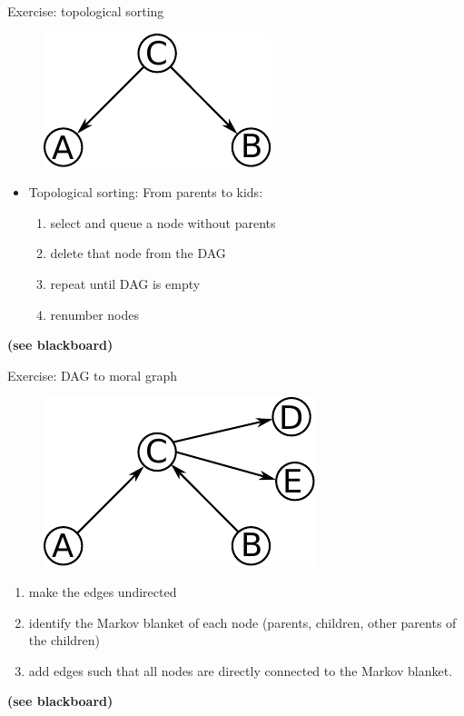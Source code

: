 \begin{frame}

Exercise: topological sorting

\begin{figure}[h]
	\centering
	\includegraphics[width=0.3\linewidth]{img/cond}%
    \label{fig:cond}%
\end{figure}

	\begin{itemize}
		\item Topological sorting: From parents to kids:
			\begin{enumerate}
				\item select and queue a node without parents
				\item delete that node from the DAG
				\item repeat until DAG is empty
				\item renumber nodes
			\end{enumerate}
	\end{itemize}


\textbf{(see blackboard)}


\end{frame}

\begin{frame}

Exercise: DAG to moral graph

\begin{figure}[h]
	\centering
	\includegraphics[width=0.3\linewidth]{img/dag1}%
    \label{fig:cond}%
\end{figure}

\begin{enumerate}
\item make the edges undirected
\item identify the Markov blanket of each node (parents, children, other parents of the children)
\item add edges such that all nodes are directly connected to the Markov blanket.
\end{enumerate}


\textbf{(see blackboard)}
    
\end{frame}
